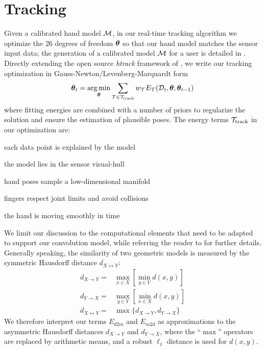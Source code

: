 


\section{Tracking}
\label{sec:tracking}
Given a calibrated hand model $\mathcal{M}$, in our real-time tracking algorithm we optimize the 26 degrees of freedom $\boldsymbol{\theta}$ so that our hand model matches the sensor input data; the generation of a calibrated model $\mathcal{M}$ for a user is detailed in . Directly extending the open source \emph{htrack} framework of \cite{tagliasacchi2015robust}, we write our tracking optimization in Gauss-Newton/Levenberg-Marquardt form
% 
\begin{eqnarray}
\boldsymbol{\theta}_t = \operatorname*{arg\,min}_{\boldsymbol{\theta}}
\sum_{\mathcal{T} \in {\mathcal{T}_\text{track}}} 
w_\mathcal{T} E_\mathcal{T}(\mathcal{D}_t,\boldsymbol{\theta},\boldsymbol{\theta}_{t-1})
\label{eq:htrack}
\end{eqnarray}
% 
where fitting energies are combined with a number of priors to regularize the solution and ensure the estimation of plausible poses. The energy terms ${\mathcal{T}_\text{track}}$ in our optimization are:
% 
\begin{description}[labelsep=0em,labelwidth=.6in,labelindent=.25cm]
    \item[d2m] each data point is explained by the model
    \item[m2d] the model lies in the sensor visual-hull
    \item[pose] hand poses sample a low-dimensional manifold
    \item[kinematic] fingers respect joint limits and avoid collisions
    \item[temporal] the hand is moving smoothly in time
\end{description}
% 
We limit our discussion to the computational elements that need to be adapted to support our convolution model, while referring the reader to \cite{tagliasacchi2015robust} for further details. 
% 
Generally speaking, the similarity of two geometric models is measured by the symmetric Hausdorff distance $d_{X \leftrightarrow Y}$:
% 
\begin{eqnarray*}
d_{X \rightarrow Y} =& \max_{x \in X} \left[ \min_{y \in Y} d(x,y) \right] \\
d_{Y \rightarrow X} =& \max_{y \in Y} \left[ \min_{x \in X} d(x,y) \right] \\
d_{X \leftrightarrow Y} =& \max \{ d_{X \rightarrow Y}, d_{Y \rightarrow X} \}
\end{eqnarray*}
We therefore interpret our terms $E_{d2m}$ and $E_{m2d}$ as approximations to the asymmetric Hausdorff distances $d_{X \rightarrow Y}$ and $d_{Y \rightarrow X}$, where the  ``$\max$'' operators are replaced by arithmetic means, and a robust $\ell_1$ distance is used for $d(x,y)$. 

